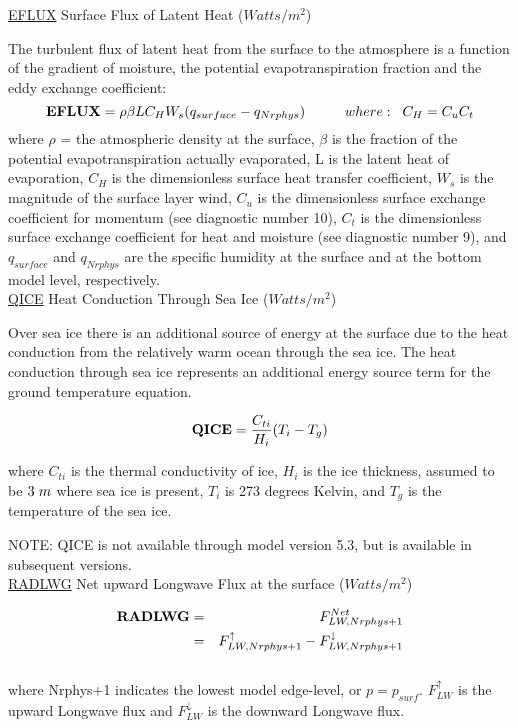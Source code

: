 { \underline {EFLUX} Surface Flux of Latent Heat ($Watts/m^2$) } 

The turbulent flux of latent heat from the surface to the atmosphere is a function of the
gradient of moisture, the potential evapotranspiration fraction and the eddy exchange coefficient:
\[
{\bf EFLUX} =  \rho \beta L C_{H} W_s (q_{surface} - q_{Nrphys})
\hspace{1cm}where: \hspace{.2cm}C_H = C_u C_t
\]
where $\rho$ = the atmospheric density at the surface, $\beta$ is the fraction of
the potential evapotranspiration actually evaporated, L is the latent
heat of evaporation, $C_{H}$ is the dimensionless surface heat transfer coefficient, $W_s$ is the 
magnitude of the surface layer wind, $C_u$ is the dimensionless surface exchange coefficient 
for momentum (see diagnostic number 10), $C_t$ is the dimensionless surface exchange coefficient 
for heat and moisture (see diagnostic number 9), and $q_{surface}$ and $q_{Nrphys}$ are the specific
humidity at the surface and at the bottom model level, respectively.
\\

{ \underline {QICE} Heat Conduction Through Sea Ice ($Watts/m^2$) } 

Over sea ice there is an additional source of energy at the surface due to the heat
conduction from the relatively warm ocean through the sea ice. The heat conduction
through sea ice represents an additional energy source term for the ground temperature equation.

\[
{\bf QICE} = \frac{C_{ti}}{H_i} (T_i-T_g)
\]

where $C_{ti}$ is the thermal conductivity of ice, $H_i$ is the ice thickness, assumed to
be $3 \hspace{.1cm} m$ where sea ice is present, $T_i$ is 273 degrees Kelvin, and
$T_g$ is the temperature of the sea ice.

NOTE: QICE is not available through model version 5.3, but is available in subsequent versions.
\\
 

{ \underline {RADLWG} Net upward Longwave Flux at the surface ($Watts/m^2$)}

\begin{eqnarray*}
{\bf RADLWG} & =  & F_{LW,Nrphys+1}^{Net} \\
             & =  & F_{LW,Nrphys+1}^\uparrow - F_{LW,Nrphys+1}^\downarrow
\end{eqnarray*}
\\
where Nrphys+1 indicates the lowest model edge-level, or $p = p_{surf}$.
$F_{LW}^\uparrow$ is
the upward Longwave flux and $F_{LW}^\downarrow$ is the downward Longwave flux.
\\

